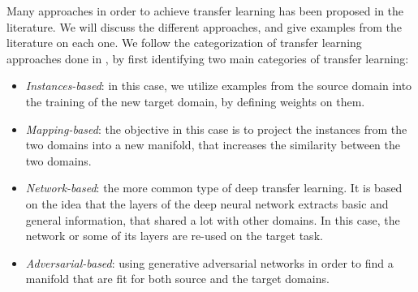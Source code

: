   \par Many approaches in order to achieve transfer learning has been proposed in the literature. We will discuss the different approaches, and give examples from the literature on each one. We follow the categorization of transfer learning approaches done in \citep{dtl2018survey}, by first identifying two main categories of transfer learning:
  \begin{itemize}
    \item \textit{Instances-based}: in this case, we utilize examples from the source domain into the training of the new target domain, by defining weights on them.
    \item \textit{Mapping-based}: the objective in this case is to project the instances from the two domains into a new manifold, that increases the similarity between the two domains.
    \item \textit{Network-based}: the more common type of deep transfer learning. It is based on the idea that the layers of the deep neural network extracts basic and general information, that shared a lot with other domains. In this case, the network or some of its layers are re-used on the target task.
    \item \textit{Adversarial-based}: using generative adversarial networks \citep{goodfellow2014generative} in order to find a manifold that are fit for both source and the target domains.
  \end{itemize}

